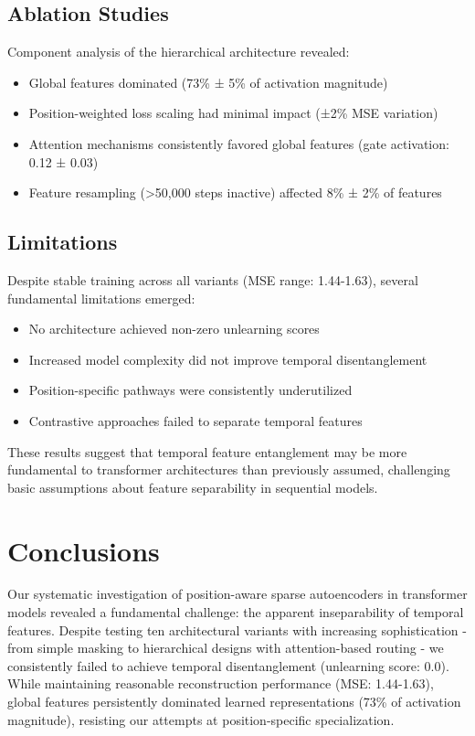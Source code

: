 \documentclass{article} %
\begin{document}
\subsection{Ablation Studies}
Component analysis of the hierarchical architecture revealed:

\begin{itemize}
    \item Global features dominated (73\% ± 5\% of activation magnitude)
    \item Position-weighted loss scaling had minimal impact (±2\% MSE variation)
    \item Attention mechanisms consistently favored global features (gate activation: 0.12 ± 0.03)
    \item Feature resampling (>50,000 steps inactive) affected 8\% ± 2\% of features
\end{itemize}

\subsection{Limitations}
Despite stable training across all variants (MSE range: 1.44-1.63), several fundamental limitations emerged:

\begin{itemize}
    \item No architecture achieved non-zero unlearning scores
    \item Increased model complexity did not improve temporal disentanglement
    \item Position-specific pathways were consistently underutilized
    \item Contrastive approaches failed to separate temporal features
\end{itemize}

These results suggest that temporal feature entanglement may be more fundamental to transformer architectures than previously assumed, challenging basic assumptions about feature separability in sequential models.

\section{Conclusions}
\label{sec:conclusion}

Our systematic investigation of position-aware sparse autoencoders in transformer models revealed a fundamental challenge: the apparent inseparability of temporal features. Despite testing ten architectural variants with increasing sophistication - from simple masking to hierarchical designs with attention-based routing - we consistently failed to achieve temporal disentanglement (unlearning score: 0.0). While maintaining reasonable reconstruction performance (MSE: 1.44-1.63), global features persistently dominated learned representations (73\% of activation magnitude), resisting our attempts at position-specific specialization.
\end{document}
